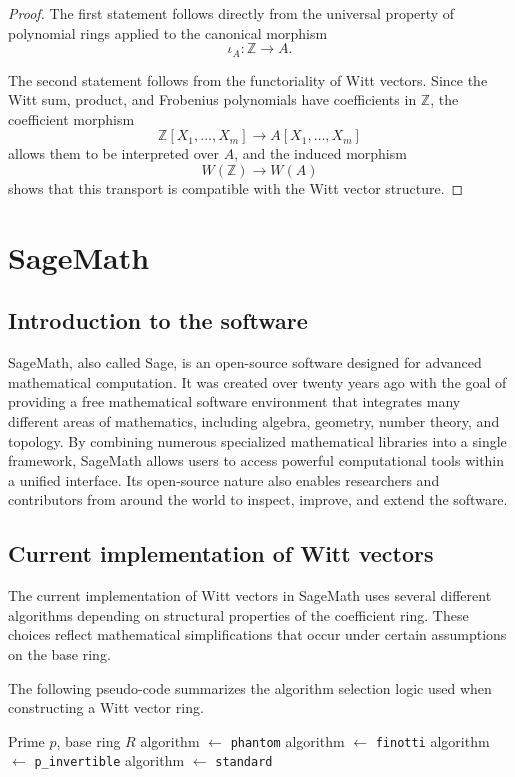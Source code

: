 \documentclass[oneside, a4paper, onecolumn, 11pt]{article}
\theoremstyle{definition}
\begin{document}
\begin{proof}
The first statement follows directly from the universal property of
polynomial rings applied to the canonical morphism \[\iota_A:\mathbb{Z}\to A.\]

The second statement follows from the functoriality of Witt vectors. Since
the Witt sum, product, and Frobenius polynomials have coefficients in
$\mathbb{Z}$, the coefficient morphism \[ \mathbb{Z}[X_1,\dots,X_m]\to A[X_1,\dots,X_m] \]
allows them to be interpreted over $A$, and the induced morphism \[W(\mathbb{Z})\to W(A)\]
shows that this transport is compatible with the Witt vector structure.
\end{proof}

\section{SageMath}
\subsection{Introduction to the software}
SageMath\cite{sagemath}, also called Sage, is an open-source software designed for advanced mathematical computation. It was created over twenty years ago with the goal of providing a free mathematical software environment that integrates many different areas of mathematics, including algebra, geometry, number theory, and topology. By combining numerous specialized mathematical libraries into a single framework, SageMath allows users to access powerful computational tools within a unified interface. Its open-source nature also enables researchers and contributors from around the world to inspect, improve, and extend the software.


\subsection{Current implementation of Witt vectors}

The current implementation of Witt vectors in SageMath \cite{sagemath} uses several different algorithms depending on structural properties of the coefficient ring. These choices reflect mathematical simplifications that occur under certain assumptions on the base ring.

The following pseudo-code summarizes the algorithm selection logic used when constructing a Witt vector ring.

\begin{algorithm}[H]
\caption{Selection of the computation algorithm in a Witt vector ring}
\label{alg:witt_algorithm_selection}
\begin{algorithmic}[1]
\Require Prime $p$, base ring $R$
        \State algorithm $\gets$ \texttt{phantom}
    \Else
        \State algorithm $\gets$ \texttt{finotti}
    \EndIf
{}
    \State algorithm $\gets$ \texttt{p\_invertible}
\Else
    \State algorithm $\gets$ \texttt{standard}
\EndIf
\end{algorithmic}
\end{algorithm}
\end{document}
